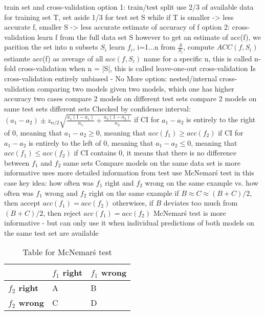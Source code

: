 \begin{outline}
    \1 train set and cross-validation
    \1 option 1: train/test split
        \2 use 2/3 of available data for training set T, set aside 1/3 for test set S
        \2 while if T is smaller -> less accurate f, smaller S -> less accurate estimate of accuracy of f
    \1 option 2: cross-validation 
        \2 learn f from the full data set S
        \2 however to get an estimate of acc(f), we parition the set into n subsets $S_{i}$
        \2 learn $f_{i}$, i=1...n from $\frac{S}{S_{i}}$, compute $ACC(f,S_{i})$
        \2 estiamte acc(f) as average of all $acc(f,S_{i})$
        \2 name
            \3 for a specific n, this is called n-fold cross-validation
            \3 when n = |S|, this is called leave-one-out cross-validation
        \2 Is cross-validation entirely unbiased - No
        \2 More option: nested/internal cross-validation
    \1 comparing two models
        \2 given two models, which one has higher accuracy
        \2 two cases
            \3 compare 2 models on different test sets
            \3 compare 2 models on same test sets
        \2 different sets
            \3 Checked by confidence interval: $(a_{1}-a_{2}) \pm z_{\alpha/2} \sqrt{\frac{a_{1}(1-a_{1})}{n_{1}} + \frac{a_{2}(1-a_{2})}{n_{2}}}$
            \3 if CI for $a_{1}-a_{2}$ is entirely to the right of 0, meaning that $a_{1}-a_{2} \geq 0$, meaning that $acc(f_{1}) \geq acc(f_{2})$
            \3 if CI for $a_{1}-a_{2}$ is entirely to the left of 0, meaning that $a_{1}-a_{2} \leq 0$, meaning that $acc(f_{1}) \leq acc(f_{2})$
            \3 if CI contains 0, it means that there is no difference between $f_{1}$ and $f_{2}$
        \2 same sets
            \3 Compare models on the same data set is more informative
            \3 uses more detailed information from test
            \3 use McNemar\'s test in this case
            \3 key idea: how often was $f_{1}$ right and $f_{2}$ wrong on the same example vs. how often was $f_{1}$ wrong and $f_{2}$ right on the same example
                \4 if $B \approx C \approx (B+C)/2$, then accept $acc(f_{1}) = acc(f_{2})$
                \4 otherwises, if $B$ deviates too much from $(B+C)/2$, then reject $acc(f_{1}) = acc(f_{2})$
            \3 McNemar\'s test is more informative - but can only use it when individual predictions of both models on the same test set are available
\end{outline}

\begin{table}[htbp]\footnotesize
    \centering
    \caption{Table for McNemar\'s test}
    \begin{tabularx}{\textwidth}{X|X|X}
    \toprule
    \textbf{ }&\textbf{$f_{1}$ right}&\textbf{$f_{1}$ wrong} \\
    \hline
    \textbf{$f_{2}$ right}&A&B \\
    \hline
    \textbf{$f_{2}$ wrong}&C&D \\
    \bottomrule
    \end{tabularx}
    \label{tab:mcnemar_table}
\end{table}

